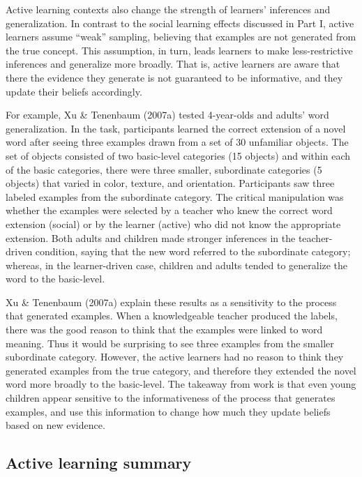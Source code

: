 \documentclass[oneside]{report}
\begin{document}
Active learning contexts also change the strength of learners'
inferences and generalization. In contrast to the social learning
effects discussed in Part I, active learners assume ``weak'' sampling,
believing that examples are not generated from the true concept. This
assumption, in turn, leads learners to make less-restrictive inferences
and generalize more broadly. That is, active learners are aware that
there the evidence they generate is not guaranteed to be informative,
and they update their beliefs accordingly.

For example, Xu \& Tenenbaum (2007a) tested 4-year-olds and adults' word
generalization. In the task, participants learned the correct extension
of a novel word after seeing three examples drawn from a set of 30
unfamiliar objects. The set of objects consisted of two basic-level
categories (15 objects) and within each of the basic categories, there
were three smaller, subordinate categories (5 objects) that varied in
color, texture, and orientation. Participants saw three labeled examples
from the subordinate category. The critical manipulation was whether the
examples were selected by a teacher who knew the correct word extension
(social) or by the learner (active) who did not know the appropriate
extension. Both adults and children made stronger inferences in the
teacher-driven condition, saying that the new word referred to the
subordinate category; whereas, in the learner-driven case, children and
adults tended to generalize the word to the basic-level.

Xu \& Tenenbaum (2007a) explain these results as a sensitivity to the
process that generated examples. When a knowledgeable teacher produced
the labels, there was the good reason to think that the examples were
linked to word meaning. Thus it would be surprising to see three
examples from the smaller subordinate category. However, the active
learners had no reason to think they generated examples from the true
category, and therefore they extended the novel word more broadly to the
basic-level. The takeaway from work is that even young children appear
sensitive to the informativeness of the process that generates examples,
and use this information to change how much they update beliefs based on
new evidence.

\hypertarget{active-learning-summary}{%
\subsection{Active learning summary}\label{active-learning-summary}}
\end{document}

